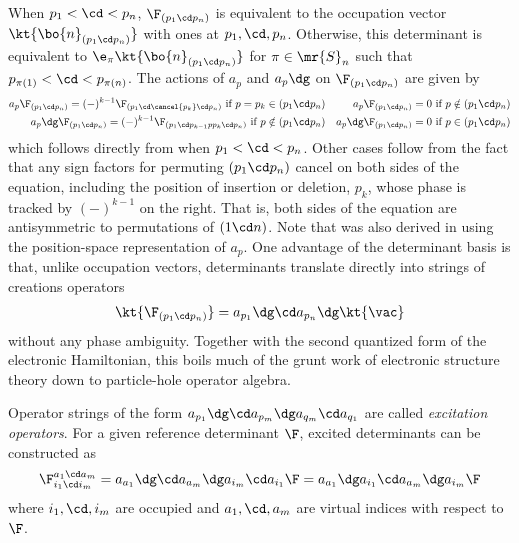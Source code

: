 \begin{rmk}
When $p_1<\cd<p_n$, $\F_{(p_1\cd p_n)}$ is equivalent to the occupation vector $\kt{\bo{n}_{(p_1\cd p_n)}}$ with ones at $p_1,\cd,p_n$.
Otherwise, this determinant is equivalent to $\e_{\pi}\kt{\bo{n}_{(p_1\cd p_n)}}$ for $\pi\in\mr{S}_n$ such that $p_{\pi(1)}<\cd<p_{\pi(n)}$.
The actions of $a_p$ and $a_p\dg$ on $\F_{(p_1\cd p_n)}$ are given by
\begin{align}\label{eq:abstract-annihilation-operator-action}
  a_p\F_{(p_1\cd p_n)}
=
  (-)^{k-1}\F_{(p_1\cd\cancel{p_k}\cd p_n)}
  \ \text{if $p=p_k\in(p_1\cd p_n)$}
&&
  a_p\F_{(p_1\cd p_n)}
=
  0
  \ \text{if $p\notin(p_1\cd p_n)$}
\\\label{eq:abstract-creation-operator-action}
  a_p\dg\F_{(p_1\cd p_n)}
=
  (-)^{k-1}\F_{(p_1\cd p_{k-1}pp_k\cd p_n)}
  \ \text{if $p\notin(p_1\cd p_n)$}
&&
  a_p\dg\F_{(p_1\cd p_n)}
=
  0
  \ \text{if $p\in(p_1\cd p_n)$}
\end{align}
which follows directly from  when $p_1<\cd<p_n$.
Other cases follow from the fact that any sign factors for permuting $(p_1\cd p_n)$ cancel on both sides of the equation, including the position of insertion or deletion, $p_k$, whose phase is tracked by $(-)^{k-1}$ on the right.
That is, both sides of the equation are antisymmetric to permutations of $(1\cd n)$.
Note that  was also derived in  using the position-space representation of $a_p$.
One advantage of the determinant basis is that, unlike occupation vectors, determinants translate directly into strings of creations operators
\begin{align}
  \kt{\F_{(p_1\cd p_n)}}
=
  a_{p_1}\dg\cd a_{p_n}\dg\kt{\vac}
\end{align}
without any phase ambiguity.
Together with the second quantized form of the electronic Hamiltonian, this boils much of the grunt work of electronic structure theory down to particle-hole operator algebra.
\end{rmk}

\begin{dfn}
Operator strings of the form $a_{p_1}\dg\cd a_{p_m}\dg a_{q_m}\cd a_{q_1}$ are called \textit{excitation operators}.
For a given reference determinant $\F$, excited determinants can be constructed as
\begin{align}
  \F_{i_1\cd i_m}^{a_1\cd a_m}
=
  a_{a_1}\dg\cd a_{a_m}\dg a_{i_m}\cd a_{i_1}\F
=
  a_{a_1}\dg a_{i_1}\cd a_{a_m}\dg a_{i_m}\F
\end{align}
where $i_1,\cd,i_m$ are occupied and $a_1,\cd,a_m$ are virtual indices with respect to $\F$.
\end{dfn}

